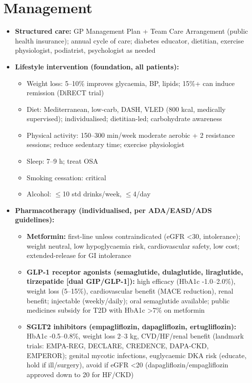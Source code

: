 \section*{Management}
\begin{itemize}
    \item \textbf{Structured care:} GP Management Plan + Team Care Arrangement (public health insurance); annual cycle of care; diabetes educator, dietitian, exercise physiologist, podiatrist, psychologist as needed
    \item \textbf{Lifestyle intervention (foundation, all patients):}
    \begin{itemize}
        \item Weight loss: 5--10\% improves glycaemia, BP, lipids; 15\%+ can induce remission (DiRECT trial)
        \item Diet: Mediterranean, low-carb, DASH, VLED (800 kcal, medically supervised); individualised; dietitian-led; carbohydrate awareness
        \item Physical activity: 150--300 min/week moderate aerobic + 2 resistance sessions; reduce sedentary time; exercise physiologist
        \item Sleep: 7--9 h; treat OSA
        \item Smoking cessation: critical
        \item Alcohol: $\le$10 std drinks/week, $\le$4/day
    \end{itemize}
    \item \textbf{Pharmacotherapy (individualised, per ADA/EASD/ADS guidelines):}
    \begin{itemize}
        \item \textbf{Metformin:} first-line unless contraindicated (eGFR <30, intolerance); weight neutral, low hypoglycaemia risk, cardiovascular safety, low cost; extended-release for GI intolerance
        \item \textbf{GLP-1 receptor agonists (semaglutide, dulaglutide, liraglutide, tirzepatide [dual GIP/GLP-1]):} high efficacy (HbA1c -1.0--2.0\%), weight loss (5--15\%), cardiovascular benefit (MACE reduction), renal benefit; injectable (weekly/daily); oral semaglutide available; public medicines subsidy for T2D with HbA1c >7\% on metformin
        \item \textbf{SGLT2 inhibitors (empagliflozin, dapagliflozin, ertugliflozin):} HbA1c -0.5--0.8\%, weight loss 2--3 kg, CVD/HF/renal benefit (landmark trials: EMPA-REG, DECLARE, CREDENCE, DAPA-CKD, EMPEROR); genital mycotic infections, euglycaemic DKA risk (educate, hold if ill/surgery), avoid if eGFR <20 (dapagliflozin/empagliflozin approved down to 20 for HF/CKD)

\end{itemize}
\end{itemize}
